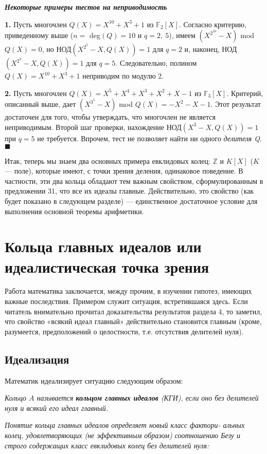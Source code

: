 \noindent\textbf{\textit{Некоторые примеры тестов на неприводимость}}

\textbf{1.} Пусть многочлен $Q(X) = X^{10} + X^3 + 1$ из $\mathbb{F}_2[X]$. Согласно  
критерию, приведенному выше ($n = $ deg$(Q) = 10$ и $q = 2,\: 5$), имеем 
$(X^{2^{10}} - X)$ mod $Q(X) = 0$, но НОД$(X^{2^5} - X,Q(X)) = 1$ для $q = 2$ и, 
наконец, НОД$(X^{2^2} - X, Q(X)) = 1$ для $q = 5$. Следовательно, полином 
$Q(X) = X^{10} + X^3 + 1$ неприводим по модулю 2.
\pagebreak

\textbf{2.}  Пусть многочлен $Q(X) = X^5 + X^4 + X^3 + X^2 + X - 1$ из $\mathbb{F}_3[X]$. 
Критерий, описанный выше, дает $(X^{3^5} - X)$ mod $Q(X) = -X^2 - X - 1$. 
Этот результат достаточен для того, чтобы утверждать, что  
многочлен не является неприводимым. Второй шаг проверки, нахождение 
НОД$(X^3 - X, Q(X)) = 1$ при $q = 5$ не требуется. Впрочем, тест не 
позволяет найти ни одного \textit{делителя Q}.\hspace{13.1cm}$\blacksquare$\newline


Итак, теперь мы знаем два основных примера евклидовых колец: $\mathbb{Z}$ 
и $K[X]$ ($K$ — поле), которые имеют, с точки зрения деления,  
одинаковое поведение. В частности, эти два кольца обладают тем важным 
свойством, сформулированным в предложении 31, что все их идеалы 
главные. Действительно, это свойство (как будет показано в следующем 
разделе) — единственное достаточное условие для выполнения  
основной теоремы арифметики.\newline

\section{Кольца главных идеалов или идеалистическая точка зрения}
Работа математика заключается, между прочим, в изучении гипотез, 
имеющих важные последствия. Примером служит ситуация,  
встретившаяся здесь. Если читатель внимательно прочитал доказательства  
результатов раздела 4, то заметил, что свойство «всякий идеал главный» 
действительно становится главным (кроме, разумеется, предположений 
о целостности, т.е. отсутствия делителей нуля). 

\subsection{Идеализация}
Математик идеализирует ситуацию следующим образом:

\begin{determ}
\hspace*{15pt}\textit{Кольцо $A$ называется \textbf{кольцом главных идеалов} (КГИ), если оно 
без делителей нуля и всякий его идеал главный.}
 
\textit{Понятие кольца главных идеалов определяет новый класс фактори- 
альных колец, удовлетворяющих (не эффективным образом)  
соотношению Безу и строго содержащих класс евклидовых колец без делителей 
нуля:} 
\end{determ}

